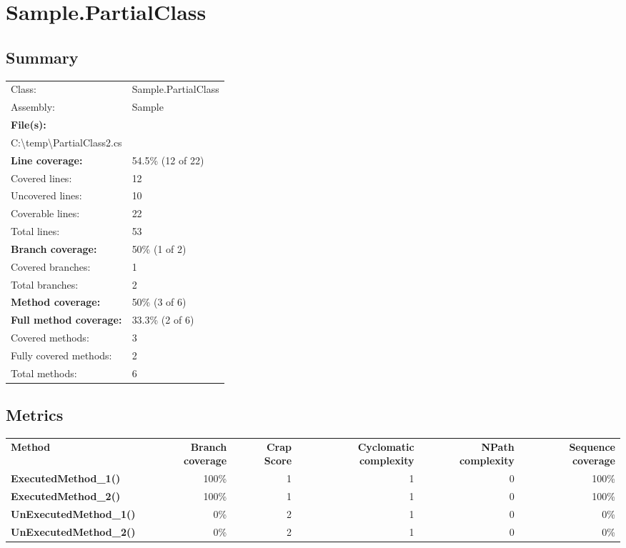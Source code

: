\documentclass[a4paper,landscape,10pt]{article}
\begin{document}
\section{Sample.PartialClass}
\subsection{Summary}
\begin{longtable}[l]{ll}
Class: & Sample.PartialClass\\
Assembly: & Sample\\
\textbf{File(s):} & \begin{minipage}[t]{12cm}{C:\textbackslash temp\textbackslash PartialClass.cs\\C:\textbackslash temp\textbackslash PartialClass2.cs}\end{minipage} \\
\textbf{Line coverage:} & 54.5\% (12 of 22)\\
Covered lines: & 12\\
Uncovered lines: & 10\\
Coverable lines: & 22\\
Total lines: & 53\\
\textbf{Branch coverage:} & 50\% (1 of 2)\\
Covered branches: & 1\\
Total branches: & 2\\
\textbf{Method coverage:} & 50\% (3 of 6)\\
\textbf{Full method coverage:} & 33.3\% (2 of 6)\\
Covered methods: & 3\\
Fully covered methods: & 2\\
Total methods: & 6\\
\end{longtable}
\subsection{Metrics}
\begin{longtable}[l]{|l|r|r|r|r|r|}
\textbf{Method} & \textbf{Branch coverage} & \textbf{Crap Score} & \textbf{Cyclomatic complexity} & \textbf{NPath complexity} & \textbf{Sequence coverage}\\
\textbf{ExecutedMethod\_1()} & 100\% & 1 & 1 & 0 & 100\%\\
\textbf{ExecutedMethod\_2()} & 100\% & 1 & 1 & 0 & 100\%\\
\textbf{UnExecutedMethod\_1()} & 0\% & 2 & 1 & 0 & 0\%\\
\textbf{UnExecutedMethod\_2()} & 0\% & 2 & 1 & 0 & 0\%\\
\end{longtable}
\end{document}
